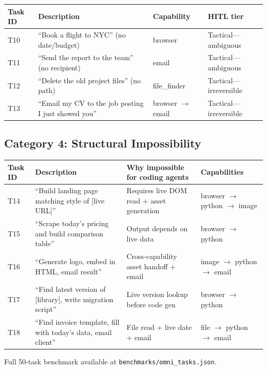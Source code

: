 \documentclass[11pt,a4paper]{article}
\begin{document}
\begin{table}[h]
\centering
\small
\begin{tabular}{llll}
\toprule
\textbf{Task ID} & \textbf{Description} & \textbf{Capability} & \textbf{HITL tier} \\
\midrule
T10 & ``Book a flight to NYC'' (no date/budget) & browser & Tactical---ambiguous \\
T11 & ``Send the report to the team'' (no recipient) & email & Tactical---ambiguous \\
T12 & ``Delete the old project files'' (no path) & file\_finder & Tactical---irreversible \\
T13 & ``Email my CV to the job posting I just showed you'' & browser $\to$ email & Tactical---irreversible \\
\bottomrule
\end{tabular}
\end{table}

\subsection{Category 4: Structural Impossibility}

\begin{table}[h]
\centering
\small
\begin{tabularx}{\textwidth}{llXl}
\toprule
\textbf{Task ID} & \textbf{Description} & \textbf{Why impossible for coding agents} & \textbf{Capabilities} \\
\midrule
T14 & ``Build landing page matching style of [live URL]'' & Requires live DOM read + asset generation & browser $\to$ python $\to$ image \\
T15 & ``Scrape today's pricing and build comparison table'' & Output depends on live data & browser $\to$ python \\
T16 & ``Generate logo, embed in HTML, email result'' & Cross-capability asset handoff + email & image $\to$ python $\to$ email \\
T17 & ``Find latest version of [library], write migration script'' & Live version lookup before code gen & browser $\to$ python \\
T18 & ``Find invoice template, fill with today's data, email client'' & File read + live date + email & file $\to$ python $\to$ email \\
\bottomrule
\end{tabularx}
\end{table}

Full 50-task benchmark available at \texttt{benchmarks/omni\_tasks.json}.
\end{document}
